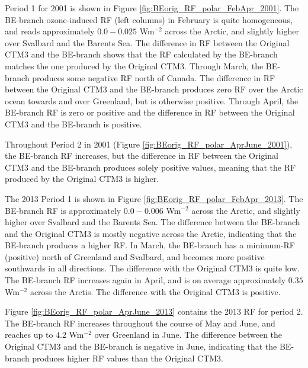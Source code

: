 Period 1 for 2001 is shown in Figure \ref{fig:BEorig_RF_polar_FebApr_2001}. The BE-branch ozone-induced RF (left columns) in February is quite homogeneous, and reads approximately $0.0-0.025$ Wm$^{-2}$ across the Arctic, and slightly higher over Svalbard and the Barents Sea. The difference in RF between the Original CTM3 and the BE-branch shows that the RF calculated by the BE-branch matches the one produced by the Original CTM3. Through March, the BE-branch produces some negative RF north of Canada. The difference in RF between the Original CTM3 and the BE-branch produces zero RF over the Arctic ocean towards and over Greenland, but is otherwise positive. Through April, the BE-branch RF is zero or positive and the difference in RF between the Original CTM3 and the BE-branch is positive.

\medskip

Throughout Period 2 in 2001 (Figure \ref{fig:BEorig_RF_polar_AprJune_2001}), the BE-branch RF increases, but the difference in RF between the Original CTM3 and the BE-branch produces solely positive values, meaning that the RF produced by the Original CTM3 is higher.

\medskip

The 2013 Period 1 is shown in Figure \ref{fig:BEorig_RF_polar_FebApr_2013}. The BE-branch RF is approximately $0.0-0.006$ Wm$^{-2}$ across the Arctic, and slightly higher over Svalbard and the Barents Sea. The difference between the BE-branch and the Original CTM3 is mostly negative across the Arctic, indicating that the BE-branch produces a higher RF. In March, the BE-branch has a minimum-RF (positive) north of Greenland and Svalbard, and becomes more positive southwards in all directions. The difference with the Original CTM3 is quite low. The BE-branch RF increases again in April, and is on average approximately $0.35$ Wm$^{-2}$ across the Arctis. The difference with the Original CTM3 is positive.

\medskip

Figure \ref{fig:BEorig_RF_polar_AprJune_2013} contains the 2013 RF for period 2. The BE-branch RF increases throughout the course of May and June, and reaches up to $4.2$ Wm$^{-2}$ over Greenland in June. The difference between the Original CTM3 and the BE-branch is negative in June, indicating that the BE-branch produces higher RF values than the  Original CTM3.

\medskip

